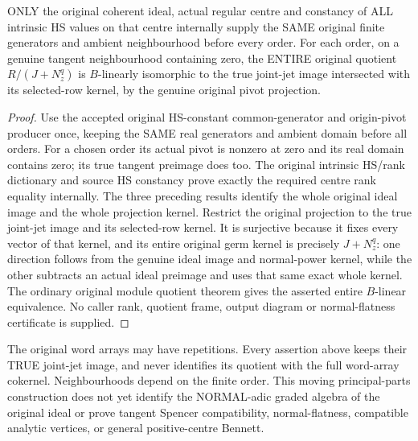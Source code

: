 \begin{theorem}
\label{hir:actual-hs-constant-centre-whole-principal-parts}
ONLY the original coherent ideal, actual regular centre and constancy
of ALL intrinsic HS values on that centre internally supply the SAME
original finite generators and ambient neighbourhood before every
order. For each order, on a genuine tangent neighbourhood containing
zero, the ENTIRE original quotient $R/(J+N_z^q)$ is $B$-linearly
isomorphic to the true joint-jet image intersected with its selected-row
kernel, by the genuine original pivot projection.
\leanok
\end{theorem}
\begin{proof}
Use the accepted original HS-constant common-generator and origin-pivot
producer once, keeping the SAME real generators and ambient domain
before all orders. For a chosen order its actual pivot is nonzero at
zero and its real domain contains zero; its true tangent preimage does
too. The original intrinsic HS/rank dictionary and source HS constancy
prove exactly the required centre rank equality internally. The three
preceding results identify the whole original ideal image and the
whole projection kernel. Restrict the original projection to the true
joint-jet image and its selected-row kernel. It is surjective because
it fixes every vector of that kernel, and its entire original germ
kernel is precisely $J+N_z^q$: one direction follows from the genuine
ideal image and normal-power kernel, while the other subtracts an
actual ideal preimage and uses that same exact whole kernel. The
ordinary original module quotient theorem gives the asserted entire
$B$-linear equivalence. No caller rank, quotient frame, output diagram
or normal-flatness certificate is supplied.
\end{proof}

The original word arrays may have repetitions. Every assertion above
keeps their TRUE joint-jet image, and never identifies its quotient with
the full word-array cokernel. Neighbourhoods depend on the finite order.
This moving principal-parts construction does not yet identify the
NORMAL-adic graded algebra of the original ideal or prove tangent
Spencer compatibility, normal-flatness, compatible analytic vertices,
or general positive-centre Bennett.

